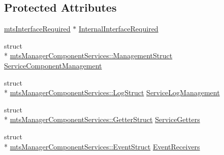 \subsection*{Protected Attributes}
\begin{DoxyCompactItemize}
\item 
\hyperlink{classmts_interface_required}{mts\-Interface\-Required} $\ast$ \hyperlink{classmts_manager_component_services_a56e054d1c774cec82eaa0ae12406b02d}{Internal\-Interface\-Required}
\item 
struct \\*
\hyperlink{structmts_manager_component_services_1_1_management_struct}{mts\-Manager\-Component\-Services\-::\-Management\-Struct} \hyperlink{classmts_manager_component_services_afa9127a7692a729340f2eb537e3d1f43}{Service\-Component\-Management}
\item 
struct \\*
\hyperlink{structmts_manager_component_services_1_1_log_struct}{mts\-Manager\-Component\-Services\-::\-Log\-Struct} \hyperlink{classmts_manager_component_services_a521a825f8142d5b44abf696abab1f8ef}{Service\-Log\-Management}
\item 
struct \\*
\hyperlink{structmts_manager_component_services_1_1_getter_struct}{mts\-Manager\-Component\-Services\-::\-Getter\-Struct} \hyperlink{classmts_manager_component_services_aa2830971a51549f362b28011511b177f}{Service\-Getters}
\item 
struct \\*
\hyperlink{structmts_manager_component_services_1_1_event_struct}{mts\-Manager\-Component\-Services\-::\-Event\-Struct} \hyperlink{classmts_manager_component_services_a67de7453cfaa919be46b18586e2d5d57}{Event\-Receivers}
\end{DoxyCompactItemize}


